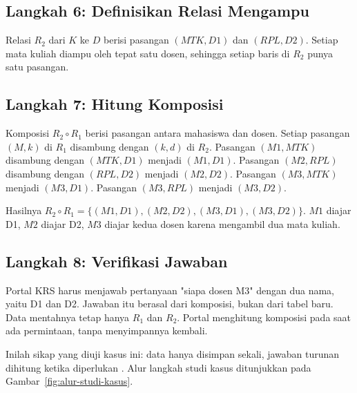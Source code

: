 \documentclass[11pt,a4paper]{article}
\begin{document}
\subsection{Langkah 6: Definisikan Relasi Mengampu}

Relasi $R_2$ dari $K$ ke $D$ berisi pasangan $(MTK,D1)$ dan $(RPL,D2)$. Setiap mata kuliah diampu oleh tepat satu dosen, sehingga setiap baris di $R_2$ punya satu pasangan.

\subsection{Langkah 7: Hitung Komposisi}

Komposisi $R_2 \circ R_1$ berisi pasangan antara mahasiswa dan dosen. Setiap pasangan $(M,k)$ di $R_1$ disambung dengan $(k,d)$ di $R_2$. Pasangan $(M1,MTK)$ disambung dengan $(MTK,D1)$ menjadi $(M1,D1)$. Pasangan $(M2,RPL)$ disambung dengan $(RPL,D2)$ menjadi $(M2,D2)$. Pasangan $(M3,MTK)$ menjadi $(M3,D1)$. Pasangan $(M3,RPL)$ menjadi $(M3,D2)$.

Hasilnya $R_2 \circ R_1=\{(M1,D1),(M2,D2),(M3,D1),(M3,D2)\}$. $M1$ diajar D1, $M2$ diajar D2, $M3$ diajar kedua dosen karena mengambil dua mata kuliah.

\subsection{Langkah 8: Verifikasi Jawaban}

Portal KRS harus menjawab pertanyaan "siapa dosen M3" dengan dua nama, yaitu D1 dan D2. Jawaban itu berasal dari komposisi, bukan dari tabel baru. Data mentahnya tetap hanya $R_1$ dan $R_2$. Portal menghitung komposisi pada saat ada permintaan, tanpa menyimpannya kembali.

Inilah sikap yang diuji kasus ini: data hanya disimpan sekali, jawaban turunan dihitung ketika diperlukan \cite{silberschatz}. Alur langkah studi kasus ditunjukkan pada Gambar~\ref{fig:alur-studi-kasus}.
\end{document}
